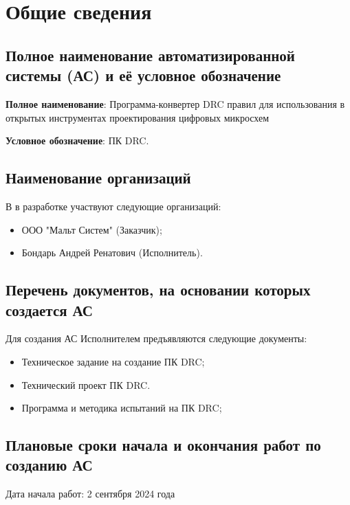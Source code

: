 \section{Общие сведения}

\subsection{Полное наименование автоматизированной системы (АС)
	и её условное обозначение}

\textbf{Полное наименование}:
Программа-конвертер DRC правил для использования
в открытых инструментах проектирования цифровых микросхем

\textbf{Условное обозначение}: ПК DRC.

\subsection{Наименование организаций}

В в разработке участвуют следующие организаций:

\begin{itemize}
	\item ООО "Мальт Систем" (Заказчик);
	\item Бондарь Андрей Ренатович (Исполнитель).
\end{itemize}

\subsection{Перечень документов, на основании которых создается АС}

Для создания АС Исполнителем предъявляются следующие документы:

\begin{itemize}
	\item Техническое задание на создание ПК DRC;
	\item Технический проект ПК DRC.
	\item Программа и методика испытаний на ПК DRC;
\end{itemize}

\subsection{Плановые сроки начала и окончания работ по созданию АС}

Дата начала работ: 2 сентября 2024 года

